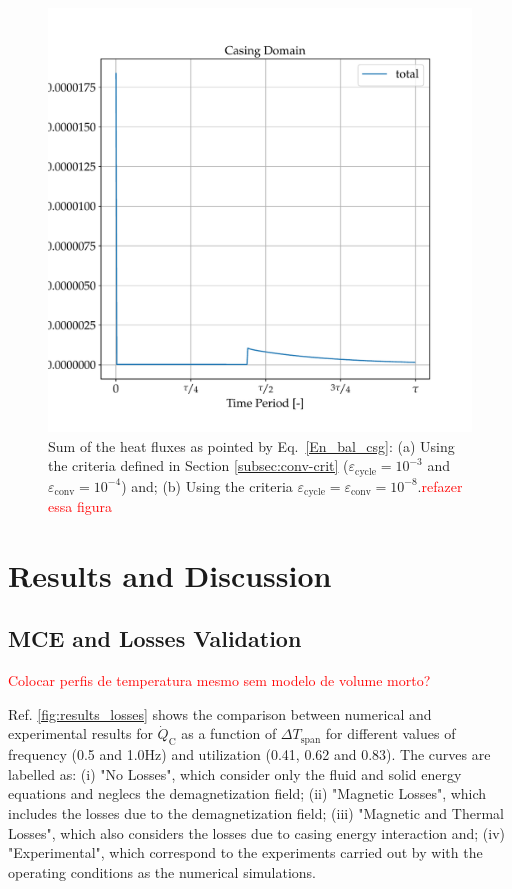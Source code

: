 \documentclass[review,preprint,12pt]{elsarticle}
\begin{document}
\begin{figure}[!ht]
  \centering
  \includegraphics[scale=0.6]{CE_casing_3.pdf}
  \caption{Sum of the heat fluxes as pointed by Eq.~\eqref{En_bal_csg}: (a) Using the criteria defined in Section \ref{subsec:conv-crit} ($\varepsilon_\textrm{cycle}= 10^{-3}$ and $\varepsilon_\textrm{conv} = 10^{-4}$) and; (b) Using the criteria $\varepsilon_\textrm{cycle}= \varepsilon_\textrm{conv} = 10^{-8}$.\textcolor{red}{refazer essa figura}}
  \label{fig:CE_csg_2}
\end{figure}



\section{Results and Discussion}

\subsection{MCE and Losses Validation}

\textcolor{red}{Colocar perfis de temperatura mesmo sem modelo de volume morto?}

Ref. \ref{fig:results_losses} shows the comparison between numerical and experimental results for $\dot{Q}_\textrm{C}$ as a function of $\Delta T_\textrm{span}$ for different values of frequency (0.5 and 1.0Hz) and utilization (0.41, 0.62 and 0.83). The curves are labelled as: (i) "No Losses", which consider only the fluid and solid energy equations and neglecs the demagnetization field; (ii) "Magnetic Losses", which includes the losses due to the demagnetization field; (iii) "Magnetic and Thermal Losses", which also considers the losses due to casing energy interaction and; (iv) "Experimental", which correspond to the experiments carried out by \cite{Trevizoli2015} with the operating conditions as the numerical simulations.
\end{document}
